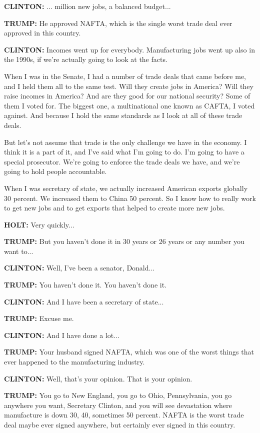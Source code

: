 \textbf{CLINTON:} ... million new jobs, a balanced budget...

\textbf{TRUMP:} He approved NAFTA, which is the single worst trade deal
ever approved in this country.

\textbf{CLINTON:} Incomes went up for everybody. Manufacturing jobs went
up also in the 1990s, if we're actually going to look at the facts.

When I was in the Senate, I had a number of trade deals that came before
me, and I held them all to the same test. Will they create jobs in
America? Will they raise incomes in America? And are they good for our
national security? Some of them I voted for. The biggest one, a
multinational one known as CAFTA, I voted against. And because I hold
the same standards as I look at all of these trade deals.

But let's not assume that trade is the only challenge we have in the
economy. I think it is a part of it, and I've said what I'm going to do.
I'm going to have a special prosecutor. We're going to enforce the trade
deals we have, and we're going to hold people accountable.

When I was secretary of state, we actually increased American exports
globally 30 percent. We increased them to China 50 percent. So I know
how to really work to get new jobs and to get exports that helped to
create more new jobs.

\textbf{HOLT:} Very quickly...

\textbf{TRUMP:} But you haven't done it in 30 years or 26 years or any
number you want to...

\textbf{CLINTON:} Well, I've been a senator, Donald...

\textbf{TRUMP:} You haven't done it. You haven't done it.

\textbf{CLINTON:} And I have been a secretary of state...

\textbf{TRUMP:} Excuse me.

\textbf{CLINTON:} And I have done a lot...

\textbf{TRUMP:} Your husband signed NAFTA, which was one of the worst
things that ever happened to the manufacturing industry.

\textbf{CLINTON:} Well, that's your opinion. That is your opinion.

\textbf{TRUMP:} You go to New England, you go to Ohio, Pennsylvania, you
go anywhere you want, Secretary Clinton, and you will see devastation
where manufacture is down 30, 40, sometimes 50 percent. NAFTA is the
worst trade deal maybe ever signed anywhere, but certainly ever signed
in this country.

